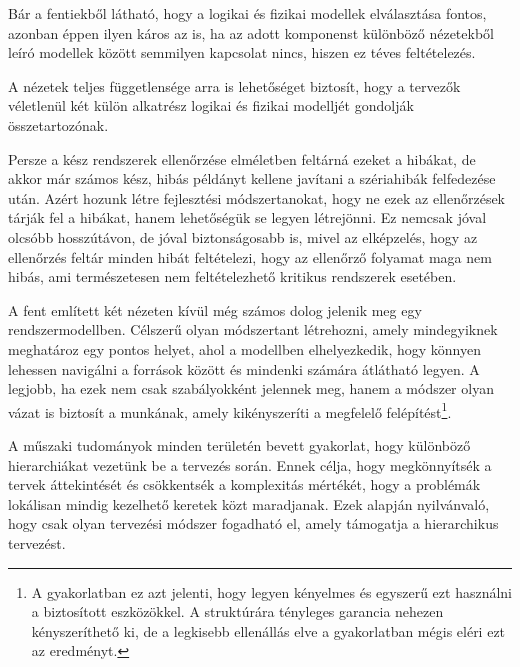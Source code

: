         \begin{req}
            Bár a fentiekből látható, hogy a logikai és fizikai modellek elválasztása fontos, azonban éppen ilyen káros az is, ha az adott komponenst különböző nézetekből leíró modellek között semmilyen kapcsolat nincs, hiszen ez téves feltételezés.
        
            A nézetek teljes függetlensége arra is lehetőséget biztosít, hogy a tervezők véletlenül két külön alkatrész logikai és fizikai modelljét gondolják összetartozónak.
            
            Persze a kész rendszerek ellenőrzése elméletben feltárná ezeket a hibákat, de akkor már számos kész, hibás példányt kellene javítani a szériahibák felfedezése után.
            Azért hozunk létre fejlesztési módszertanokat, hogy ne ezek az ellenőrzések tárják fel a hibákat, hanem lehetőségük se legyen létrejönni.
            Ez nemcsak jóval olcsóbb hosszútávon, de jóval biztonságosabb is, mivel az elképzelés, hogy az ellenőrzés feltár minden hibát feltételezi, hogy az ellenőrző folyamat maga nem hibás, ami természetesen nem feltételezhető kritikus rendszerek esetében.
        \end{req}

        \begin{req}
            A fent említett két nézeten kívül még számos dolog jelenik meg egy rendszermodellben.
            Célszerű olyan módszertant létrehozni, amely mindegyiknek meghatároz egy pontos helyet, ahol a modellben elhelyezkedik, hogy könnyen lehessen navigálni a források között és mindenki számára átlátható legyen.
            A legjobb, ha ezek nem csak szabályokként jelennek meg, hanem a módszer olyan vázat is biztosít a munkának, amely kikényszeríti a megfelelő felépítést\footnote{A gyakorlatban ez azt jelenti, hogy legyen kényelmes és egyszerű ezt használni a biztosított eszközökkel. A struktúrára tényleges garancia nehezen kényszeríthető ki, de a legkisebb ellenállás elve a gyakorlatban mégis eléri ezt az eredményt.}.
        \end{req}

        \begin{req} \label{sec:Hierarhia}
            A műszaki tudományok minden területén bevett gyakorlat, hogy különböző hierarchiákat vezetünk be a tervezés során.
            Ennek célja, hogy megkönnyítsék a tervek áttekintését és csökkentsék a komplexitás mértékét, hogy a problémák lokálisan mindig kezelhető keretek közt maradjanak.
            Ezek alapján nyilvánvaló, hogy csak olyan tervezési módszer fogadható el, amely támogatja a hierarchikus tervezést.    
        \end{req}

